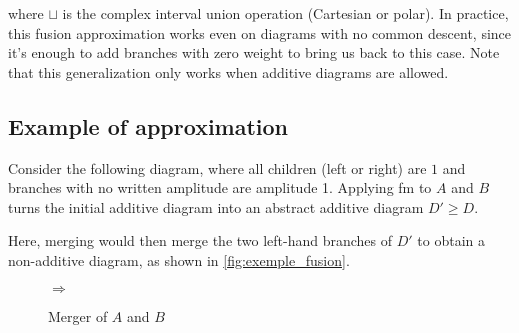 \noindent where $\sqcup$ is the complex interval union operation (Cartesian or polar). In practice, this fusion approximation works even on diagrams with no common descent, since it's enough to add branches with zero weight to bring us back to this case. Note that this generalization only works when additive diagrams are allowed.

\begin{multicols}{2}
  \section{Example of approximation}
  Consider the following diagram, where all children (left or right) are $\boxed 1$ and branches with no written amplitude are amplitude 1. Applying fm to $A$ and $B$ turns the initial additive diagram into an abstract additive diagram $D' \ge D$.

  Here, merging would then merge the two left-hand branches of $D'$ to obtain a non-additive diagram, as shown in \autoref{fig:exemple_fusion}.

  \columnbreak
  \begin{figure}[H]
    \centering
  $\Rightarrow$
  \caption{Merger of $A$ and $B$}
  \label{fig:exemple_fusion}
  \end{figure}

  \end{multicols}

